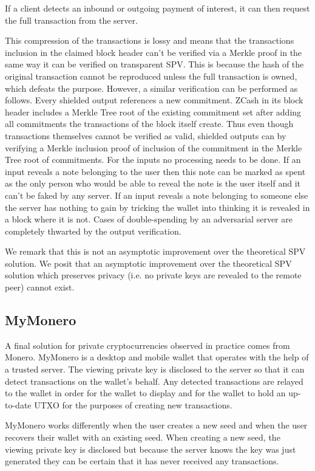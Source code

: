 \documentclass[sigconf]{acmart}
\begin{document}
If a client detects an inbound or outgoing payment of interest, it can then request the full transaction from the server.

This compression of the transactions is lossy and means that the transactions inclusion in the claimed block header can't be verified via a Merkle proof in the same way it can be verified on transparent SPV. This is because the hash of the original transaction cannot be reproduced unless the full transaction is owned, which defeats the purpose. However, a similar verification can be performed as follows. Every shielded output references a new commitment. ZCash in its block header includes a Merkle Tree root of the existing commitment set after adding all commitments the transactions of the block itself create. Thus even though transactions themselves cannot be verified as valid, shielded outputs can by verifying a Merkle inclusion proof of inclusion of the commitment in the Merkle Tree root of commitments. For the inputs no processing needs to be done. If an input reveals a note belonging to the user then this note can be marked as spent as the only person who would be able to reveal the note is the user itself and it can't be faked by any server. If an input reveals a note belonging to someone else the server has nothing to gain by tricking the wallet into thinking it is revealed in a block where it is not. Cases of double-spending by an adversarial server are completely thwarted by the output verification.

We remark that this is not an asymptotic improvement over the theoretical SPV solution. We posit that an asymptotic improvement over the theoretical SPV solution which preserves privacy (i.e. no private keys are revealed to the remote peer) cannot exist.
\subsection{MyMonero}
A final solution for private cryptocurrencies observed in practice comes from Monero. MyMonero is a desktop and mobile wallet that operates with the help of a trusted server. The viewing private key is disclosed to the server so that it can detect transactions on the wallet's behalf. Any detected transactions are relayed to the wallet in order for the wallet to display and for the wallet to hold an up-to-date UTXO for the purposes of creating new transactions.

MyMonero works differently when the user creates a new seed and when the user recovers their wallet with an existing seed. When creating a new seed, the viewing private key is disclosed but because the server knows the key was just generated they can be certain that it has never received any transactions.
\end{document}
